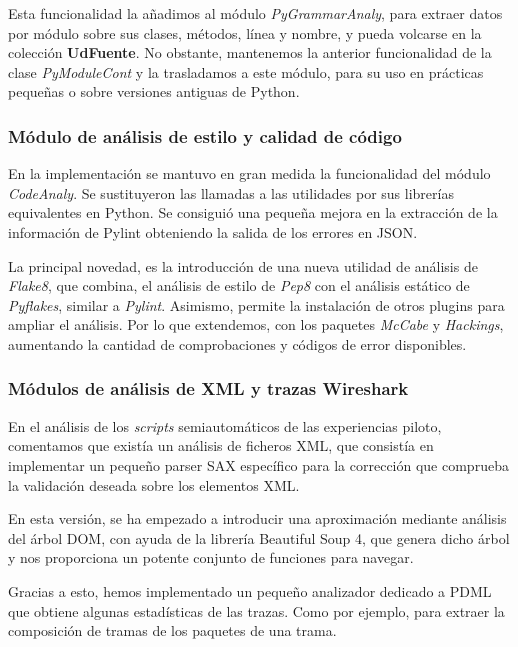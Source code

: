 Esta funcionalidad la añadimos al módulo \textit{PyGrammarAnaly}, para extraer datos por módulo sobre sus clases, métodos, línea y nombre, y pueda volcarse en la colección \textbf{UdFuente}. No obstante, mantenemos la anterior funcionalidad de la clase \textit{PyModuleCont} y la trasladamos a este módulo, para su uso en prácticas pequeñas o sobre versiones antiguas de Python.


\subsubsection{Módulo de análisis de estilo y calidad de código} 
\label{subsec:mod_anal_codigo}

En la implementación se mantuvo en gran medida la funcionalidad del módulo \textit{CodeAnaly}. Se sustituyeron las llamadas a las utilidades por sus librerías equivalentes en Python. Se consiguió una pequeña mejora en la extracción de la información de Pylint obteniendo la salida de los errores en JSON.


La principal novedad, es la introducción de una nueva utilidad de análisis de \textit{Flake8}, que combina, el análisis de estilo de \textit{Pep8} con el análisis estático de \textit{Pyflakes}, similar a \textit{Pylint}. Asimismo, permite la instalación de otros plugins para ampliar el análisis. Por lo que extendemos, con los paquetes \textit{McCabe} y \textit{Hackings}, aumentando la cantidad de comprobaciones y códigos de error disponibles.


\subsubsection{Módulos de análisis de XML y trazas Wireshark}
\label{subsec:mod_anal_xml_wireshark}

En el análisis de los \textit{scripts} semiautomáticos de las experiencias piloto, comentamos que existía un análisis de ficheros XML, que consistía en implementar un pequeño parser SAX específico para la corrección que comprueba la validación deseada sobre los elementos XML.


En esta versión,  se ha empezado a introducir una aproximación mediante análisis del árbol DOM, con ayuda de la librería Beautiful Soup 4, que genera dicho árbol y nos proporciona un potente conjunto de funciones para navegar.


Gracias a esto, hemos implementado un pequeño analizador dedicado a PDML que obtiene algunas estadísticas de las trazas. Como por ejemplo, para extraer la composición de tramas de los paquetes de una trama.

